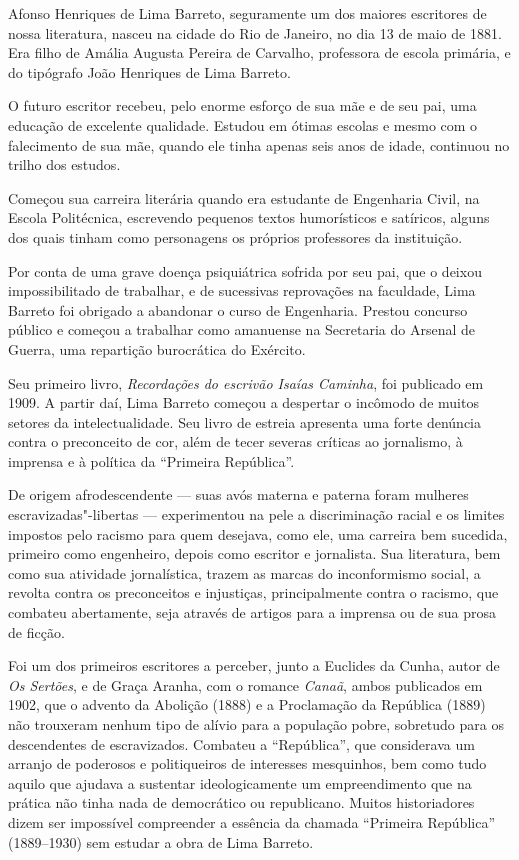 \documentclass[11pt]{extarticle}
\begin{document}
Afonso Henriques de Lima Barreto, seguramente um dos maiores escritores
de nossa literatura, nasceu na cidade do Rio de Janeiro, no dia 13 de
maio de 1881. Era filho de Amália Augusta Pereira de Carvalho,
professora de escola primária, e do tipógrafo João Henriques de Lima
Barreto.

O futuro escritor recebeu, pelo enorme esforço de sua mãe e de seu pai,
uma educação de excelente qualidade. Estudou em ótimas escolas e mesmo
com o falecimento de sua mãe, quando ele tinha apenas seis anos de
idade, continuou no trilho dos estudos.

Começou sua carreira literária quando era estudante de Engenharia Civil,
na Escola Politécnica, escrevendo pequenos textos humorísticos e
satíricos, alguns dos quais tinham como personagens os próprios
professores da instituição.

Por conta de uma grave doença psiquiátrica sofrida por seu pai, que o
deixou impossibilitado de trabalhar, e de sucessivas reprovações na
faculdade, Lima Barreto foi obrigado a abandonar o curso de Engenharia.
Prestou concurso público e começou a trabalhar como amanuense na
Secretaria do Arsenal de Guerra, uma repartição burocrática do Exército.

Seu primeiro livro, \emph{Recordações do escrivão Isaías Caminha}, foi
publicado em 1909. A partir daí, Lima Barreto começou a despertar o
incômodo de muitos setores da intelectualidade. Seu livro de estreia
apresenta uma forte denúncia contra o preconceito de cor, além de tecer
severas críticas ao jornalismo, à imprensa e à política da ``Primeira
República''.

De origem afrodescendente --- suas avós materna e paterna foram mulheres
escravizadas"-libertas --- experimentou na pele a discriminação racial e
os limites impostos pelo racismo para quem desejava, como ele, uma
carreira bem sucedida, primeiro como engenheiro, depois como escritor e
jornalista. Sua literatura, bem como sua atividade jornalística, trazem
as marcas do inconformismo social, a revolta contra os preconceitos e
injustiças, principalmente contra o racismo, que combateu abertamente,
seja através de artigos para a imprensa ou de sua prosa de ficção.

Foi um dos primeiros escritores a perceber, junto a Euclides da Cunha,
autor de \emph{Os Sertões}, e de Graça Aranha, com o romance
\emph{Canaã}, ambos publicados em 1902, que o advento da Abolição (1888)
e a Proclamação da República (1889) não trouxeram nenhum tipo de alívio
para a população pobre, sobretudo para os descendentes de escravizados.
Combateu a ``República'', que considerava um arranjo de poderosos e
politiqueiros de interesses mesquinhos, bem como tudo aquilo que ajudava
a sustentar ideologicamente um empreendimento que na prática não tinha
nada de democrático ou republicano. Muitos historiadores dizem ser
impossível compreender a essência da chamada ``Primeira República''
(1889--1930) sem estudar a obra de Lima Barreto.
\end{document}
